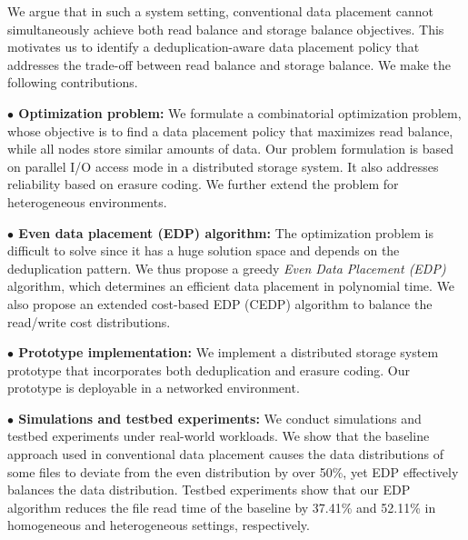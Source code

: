We argue that in such a system setting,  conventional data placement cannot
simultaneously achieve both read balance and storage balance objectives.  This
motivates us to identify a deduplication-aware data placement policy that
addresses the trade-off between read balance and storage balance.  We make the
following contributions.

{\bf $\bullet$ Optimization problem:} We formulate a combinatorial optimization
problem, whose objective is to find a data placement policy that maximizes
read balance, while all nodes store similar amounts of data.  Our problem
formulation is based on parallel I/O access mode in a distributed storage
system. It also addresses reliability based on erasure coding.  We further
extend the problem for heterogeneous environments.

{\bf $\bullet$ Even data placement (EDP) algorithm:} The optimization problem is
difficult to solve since it has a huge solution space and depends on the
deduplication pattern.  We thus propose a greedy 
\textit{Even Data Placement (EDP)} algorithm, which determines an efficient
data placement in polynomial time.  We also propose an extended cost-based EDP
(CEDP) algorithm to balance the read/write cost distributions.

{\bf $\bullet$ Prototype implementation:} We implement a distributed storage
system prototype that incorporates both deduplication and erasure coding.  Our
prototype is deployable in a networked environment.  

{\bf $\bullet$ Simulations and testbed experiments:}  We conduct simulations
and testbed experiments under real-world workloads.  We show that the baseline
approach used in conventional data placement causes the data distributions of
some files to deviate from the even distribution by over 50\%, yet EDP
effectively balances the data distribution.  Testbed experiments show that our
EDP algorithm reduces the file read time of the baseline by 37.41\% and
52.11\% in homogeneous and heterogeneous settings, respectively. 

